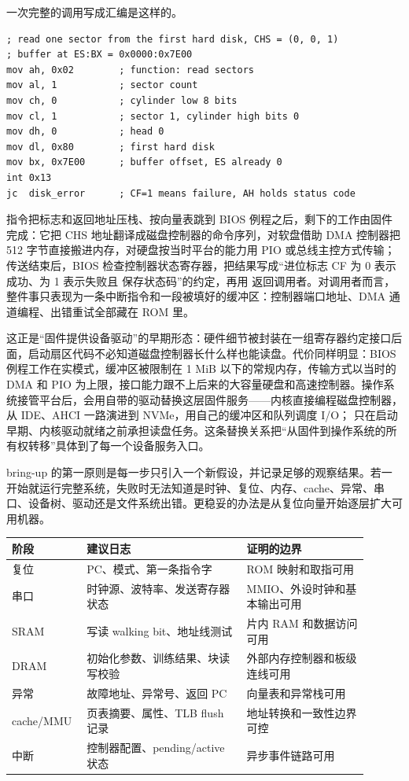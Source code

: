 一次完整的调用写成汇编是这样的。

\begin{lstlisting}
; read one sector from the first hard disk, CHS = (0, 0, 1)
; buffer at ES:BX = 0x0000:0x7E00
mov ah, 0x02        ; function: read sectors
mov al, 1           ; sector count
mov ch, 0           ; cylinder low 8 bits
mov cl, 1           ; sector 1, cylinder high bits 0
mov dh, 0           ; head 0
mov dl, 0x80        ; first hard disk
mov bx, 0x7E00      ; buffer offset, ES already 0
int 0x13
jc  disk_error      ; CF=1 means failure, AH holds status code
\end{lstlisting}

 指令把标志和返回地址压栈、按向量表跳到 BIOS 例程之后，剩下的工作由固件完成：它把 CHS 地址翻译成磁盘控制器的命令序列，对软盘借助 DMA 控制器把 512 字节直接搬进内存，对硬盘按当时平台的能力用 PIO 或总线主控方式传输；传送结束后，BIOS 检查控制器状态寄存器，把结果写成“进位标志 CF 为 0 表示成功、为 1 表示失败且  保存状态码”的约定，再用  返回调用者。对调用者而言，整件事只表现为一条中断指令和一段被填好的缓冲区：控制器端口地址、DMA 通道编程、出错重试全部藏在 ROM 里。

这正是“固件提供设备驱动”的早期形态：硬件细节被封装在一组寄存器约定接口后面，启动扇区代码不必知道磁盘控制器长什么样也能读盘。代价同样明显：BIOS 例程工作在实模式，缓冲区被限制在 1 MiB 以下的常规内存，传输方式以当时的 DMA 和 PIO 为上限，接口能力跟不上后来的大容量硬盘和高速控制器。操作系统接管平台后，会用自带的驱动替换这层固件服务——内核直接编程磁盘控制器，从 IDE、AHCI 一路演进到 NVMe，用自己的缓冲区和队列调度 I/O； 只在启动早期、内核驱动就绪之前承担读盘任务。这条替换关系把“从固件到操作系统的所有权转移”具体到了每一个设备服务入口。

bring-up 的第一原则是每一步只引入一个新假设，并记录足够的观察结果。若一开始就运行完整系统，失败时无法知道是时钟、复位、内存、cache、异常、串口、设备树、驱动还是文件系统出错。更稳妥的办法是从复位向量开始逐层扩大可用机器。

\begin{longtable}{L{0.16\linewidth}L{0.42\linewidth}L{0.32\linewidth}}
\toprule
阶段 & 建议日志 & 证明的边界 \\
\midrule
复位 & PC、模式、第一条指令字 & ROM 映射和取指可用 \\\tablerowrule
串口 & 时钟源、波特率、发送寄存器状态 & MMIO、外设时钟和基本输出可用 \\\tablerowrule
SRAM & 写读 walking bit、地址线测试 & 片内 RAM 和数据访问可用 \\\tablerowrule
DRAM & 初始化参数、训练结果、块读写校验 & 外部内存控制器和板级连线可用 \\\tablerowrule
异常 & 故障地址、异常号、返回 PC & 向量表和异常栈可用 \\\tablerowrule
cache/MMU & 页表摘要、属性、TLB flush 记录 & 地址转换和一致性边界可控 \\\tablerowrule
中断 & 控制器配置、pending/active 状态 & 异步事件链路可用 \\
\bottomrule
\end{longtable}

